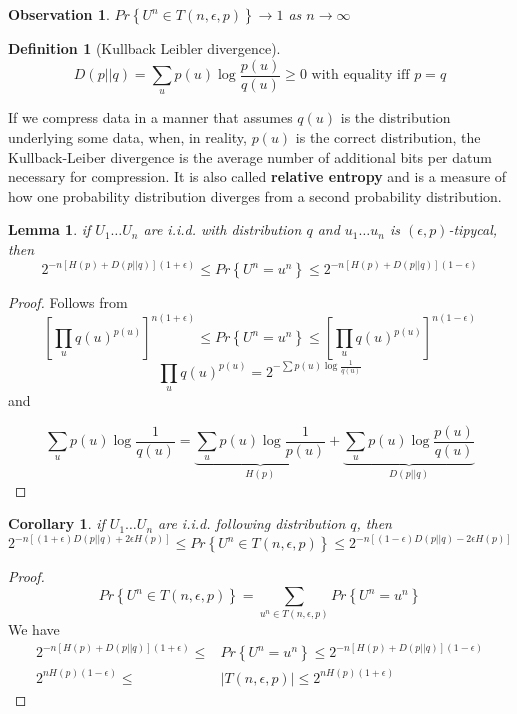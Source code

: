 \documentclass{article}
\newtheorem{corollary}{Corollary}[theorem]
\newtheorem{observation}{Observation}[section]
\newtheorem{lemma}[theorem]{Lemma}
\newtheorem{definition}{Definition}[section]
\theoremstyle{definition} %
\renewcommand{\Pr}[1]{Pr\left\{#1\right\}}
\begin{document}
\begin{observation}
  $\Pr{U^n \in T(n, \epsilon, p)} \to 1$ as $n\to \infty$
\end{observation}

\begin{definition}[Kullback Leibler divergence]
  \[
    D(p||q) = \sum_u p(u) \log \frac {p(u)} {q(u)} \geq 0 \text{ with equality iff } p = q
  \]
\end{definition}

If we compress data in a manner that assumes $q(u)$ is the distribution underlying some data, when, in reality, $p(u)$ is the correct distribution, the Kullback-Leiber divergence is the average number of additional bits per datum necessary for compression. It is also called \textbf{relative entropy} and is a measure of how one probability distribution diverges from a second probability distribution.


\begin{lemma}
  if $U_1 \dots U_n$ are i.i.d. with distribution $q$ and $u_1 \dots u_n$ is $(\epsilon, p)$-tipycal, then
  \[
    2^{-n[H(p) + D(p||q)](1+\epsilon)}
    \leq
    \Pr{U^n = u^n}
  \leq
    2^{-n[H(p) + D(p||q)](1-\epsilon)}
  \]
\end{lemma}

\begin{proof}
  Follows from
\[
  \left[ \prod_u q(u)^{p(u)} \right]^{n(1+\epsilon)} \leq \Pr{U^n = u^n} \leq  \left[ \prod_u q(u)^{p(u)} \right]^{n(1-\epsilon)}
\]
\[
  \prod_u q(u)^{p(u)} = 2^{-\sum p(u) \log \frac 1 {q(u)}}
\]
and

\[
  \sum_u p(u) \log \frac 1 {q(u)} =
  \underbrace{\sum_u p(u) \log \frac 1 {p(u)}}_{H(p)} +
  \underbrace{\sum_u p(u) \log \frac {p(u)} {q(u)}}_{D(p||q)}
\]
\end{proof}


\begin{corollary}
  if $U_1 \dots U_n$ are i.i.d. following distribution $q$, then
  \[
    2^{-n[(1+\epsilon)D(p||q)+2\epsilon H(p)]}
    \leq
    \Pr{U^n \in T(n,\epsilon,p)}
    \leq
    2^{-n[(1-\epsilon)D(p||q) - 2\epsilon H(p)]}
  \]
\end{corollary}

\begin{proof}
  \[
    \Pr{U^n \in T(n,\epsilon,p)} = \sum_{u^n \in T(n, \epsilon, p)} \Pr{U^n = u^n}
  \]
  We have
  \begin{align*}
    2^{-n[H(p) + D(p||q)](1+\epsilon)}
    \leq
    &\Pr{U^n = u^n}
    \leq
    2^{-n[H(p) + D(p||q)](1-\epsilon)}\\
    2^{nH(p)(1-\epsilon)}
    \leq
    &|T(n, \epsilon, p)|
    \leq
    2^{nH(p)(1+\epsilon)}
  \end{align*}
\end{proof}
\end{document}
